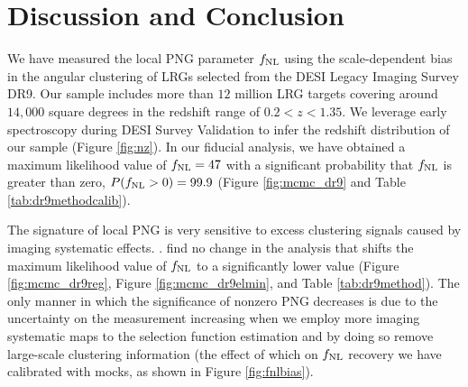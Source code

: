 \section{Discussion and Conclusion}\label{sec:conclusion}

We have measured the local PNG parameter $f_{\rm NL}$ using the scale-dependent bias in the angular clustering of LRGs selected from the DESI Legacy Imaging Survey DR9. Our sample includes more than $12$ million LRG targets covering around $14,000$ square degrees in the redshift range of $0.2< z < 1.35$. We leverage early spectroscopy during DESI Survey Validation \citep{desi2023sv} to infer the redshift distribution of our sample (Figure \ref{fig:nz}). In our fiducial analysis, we have obtained a maximum likelihood value of $f_{\rm NL}=47$ with a significant probability that $f_{\rm NL}$ is greater than zero, $P(f_{\rm NL}>0)=99.9$ (Figure \ref{fig:mcmc_dr9} and Table \ref{tab:dr9methodcalib}). 

The signature of local PNG is very sensitive to excess clustering signals caused by imaging systematic effects. .   find no change in the analysis that shifts the maximum likelihood value of $f_{\rm NL}$ to a significantly lower value (Figure \ref{fig:mcmc_dr9reg}, Figure \ref{fig:mcmc_dr9elmin}, and Table \ref{tab:dr9method}). The only manner in which the significance of nonzero PNG decreases is due to the uncertainty on the measurement increasing when we employ more imaging systematic maps to the selection function estimation and by doing so remove large-scale clustering information (the effect of which on $f_{\rm NL}$ recovery we have calibrated with mocks, as shown in Figure \ref{fig:fnlbias}).

